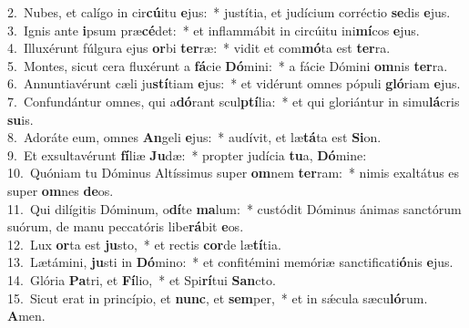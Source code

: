 {2.~}Nubes, et calígo in cir\textbf{cú}itu \textbf{e}jus:~* justítia, et judícium corréctio \textbf{se}dis \textbf{e}jus.\\
{3.~}Ignis ante \textbf{i}psum præ\textbf{cé}det:~* et inflammábit in circúitu ini\textbf{mí}cos \textbf{e}jus.\\
{4.~}Illuxérunt fúlgura ejus \textbf{or}bi \textbf{ter}ræ:~* vidit et com\textbf{mó}ta est \textbf{ter}ra.\\
{5.~}Montes, sicut cera fluxérunt a \textbf{fá}cie \textbf{Dó}mini:~* a fácie Dómini \textbf{om}nis \textbf{ter}ra.\\
{6.~}Annuntiavérunt cæli ju\textbf{stí}tiam \textbf{e}jus:~* et vidérunt omnes pópuli \textbf{gló}riam \textbf{e}jus.\\
{7.~}Confundántur omnes, qui a\textbf{dó}rant scul\textbf{ptí}lia:~* et qui gloriántur in simu\textbf{lá}cris \textbf{su}is.\\
{8.~}Adoráte eum, omnes \textbf{An}geli \textbf{e}jus:~* audívit, et læ\textbf{tá}ta est \textbf{Si}on.\\
{9.~}Et exsultavérunt \textbf{fí}liæ \textbf{Ju}dæ:~* propter judícia \textbf{tu}a, \textbf{Dó}mine:\\
{10.~}Quóniam tu Dóminus Altíssimus super \textbf{om}nem \textbf{ter}ram:~* nimis exaltátus es super \textbf{om}nes \textbf{de}os.\\
{11.~}Qui dilígitis Dóminum, o\textbf{dí}te \textbf{ma}lum:~* custódit Dóminus ánimas sanctórum suórum, de manu peccatóris libe\textbf{rá}bit \textbf{e}os.\\
{12.~}Lux \textbf{or}ta est \textbf{ju}sto,~* et rectis \textbf{cor}de læ\textbf{tí}tia.\\
{13.~}Lætámini, \textbf{ju}sti in \textbf{Dó}mino:~* et confitémini memóriæ sanctificati\textbf{ó}nis \textbf{e}jus.\\
{14.~}Glória \textbf{Pa}tri, et \textbf{Fí}lio,~* et Spi\textbf{rí}tui \textbf{San}cto.\\
{15.~}Sicut erat in princípio, et \textbf{nunc}, et \textbf{sem}per,~* et in sǽcula sæcu\textbf{ló}rum. \textbf{A}men.\\
